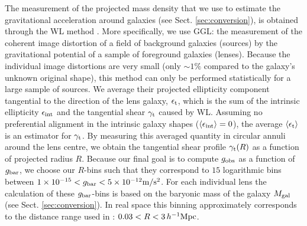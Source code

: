 \documentclass[usenatbib]{mnras}
\newcommand{\hMpc}{\, h^{-1}{\rm{Mpc}} }
\newcommand{\mpss}{ {\rm m/s^2} }
\newcommand{\lan}{\langle}
\newcommand{\ran}{\rangle}
\newcommand*{\E}[1]{\times 10^{#1}}
\newcommand{\un}[1]{_{\rm #1}}
\begin{document}
The measurement of the projected mass density that we use to estimate the gravitational acceleration around galaxies (see Sect. \ref{sec:conversion}), is obtained through the WL method \cite[for a general introduction, see][]{bartelmann2001,schneider2006}. More specifically, we use GGL: the measurement of the coherent image distortion of a field of background galaxies (sources) by the gravitational potential of a sample of foreground galaxies (lenses). Because the individual image distortions are very small (only $\sim1\%$ compared to the galaxy's unknown original shape), this method can only be performed statistically for a large sample of sources. We average their projected ellipticity component tangential to the direction of the lens galaxy, $\epsilon\un{t}$, which is the sum of the intrinsic ellipticity $\epsilon\un{int}$ and the tangential shear $\gamma\un{t}$ caused by WL. Assuming no preferential alignment in the intrinsic galaxy shapes ($\lan\epsilon\un{int}\ran=0$), the average $\lan\epsilon\un{t}\ran$ is an estimator for $\gamma\un{t}$. By measuring this averaged quantity in circular annuli around the lens centre, we obtain the tangential shear profile $\gamma\un{t}(R)$ as a function of projected radius $R$. Because our final goal is to compute $g\un{obs}$ as a function of $g\un{bar}$, we choose our $R$-bins such that they correspond to $15$ logarithmic bins between $1\E{-15} < g\un{bar} < 5\E{-12} \mpss$. For each individual lens the calculation of these $g\un{bar}$-bins is based on the baryonic mass of the galaxy $M\un{gal}$ (see Sect. \ref{sec:conversion}). In real space this binning approximately corresponds to the distance range used in \cite{brouwer2017}: $0.03 < R < 3 \hMpc$.
\end{document}
